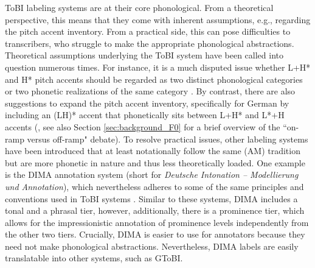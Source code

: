 ToBI labeling systems are at their core phonological. From a theoretical perspective, this means that they come with inherent assumptions, e.g., regarding the pitch accent inventory. From a practical side, this can pose difficulties to transcribers, who struggle to make the appropriate phonological abstractions. Theoretical assumptions underlying the ToBI system have been called into question numerous times. For instance, it is a much disputed issue whether L+H* and H* pitch accents should be regarded as two distinct phonological categories or two phonetic realizations of the same category \citep[e.g.,][]{laddIntonationalPhonology2008, arvanitiDisentanglingEmphasisPragmatic2022, laddTroubleToBI2022}. By contrast, there are also suggestions to expand the pitch accent inventory, specifically for German by including an (LH)* accent that phonetically sits between L+H* and L*+H accents (\citealt{zahner-ritterThreeKindsRisingFalling2022}, see also Section \ref{sec:background_F0} for a brief overview of the ``on-ramp versus off-ramp" debate). To resolve practical issues, other labeling systems have been introduced that at least notationally follow the same (AM) tradition but are more phonetic in nature and thus less theoretically loaded. One example is the DIMA annotation system (short for \textit{Deutsche Intonation – Modellierung und Annotation}), which nevertheless adheres to some of the same principles and conventions used in ToBI systems \citep{kuglerDeutscheIntonationModellierung2022}. Similar to these systems, DIMA includes a tonal and a phrasal tier, however, additionally, there is a prominence tier, which allows for the impressionistic annotation of prominence levels independently from the other two tiers. Crucially, DIMA is easier to use for annotators because they need not make phonological abstractions. Nevertheless, DIMA labels are easily translatable into other systems, such as GToBI. 

